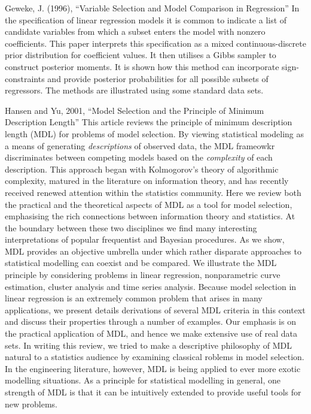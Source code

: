 \documentclass{amsart}[12pt]
\begin{document}
Geweke, J. (1996), ``Variable Selection and Model Comparison in Regression''
In the specification of linear regression models it is common to indicate a list of candidate variables from
which a subset enters the model with nonzero coefficients. This paper interprets this specification as a mixed
continuous-discrete prior distribution for coefficient values. It then utilises a Gibbs sampler to construct
posterior moments. It is shown how this method can incorporate sign-constraints and provide posterior 
probabilities for all possible subsets of regressors. The methods are illustrated using some standard data sets.

Hansen and Yu, 2001, ``Model Selection and the Principle of Minimum Description Length''
This article reviews the principle of minimum description length (MDL) for problems of model selection. By
viewing statistical modeling as a means of generating \emph{descriptions} of observed data, the MDL frameowkr
discriminates between competing models based on the \emph{complexity} of each description. This approach began
with Kolmogorov's theory of algorithmic complexity, matured in the literature on information theory, and has
recently received renewed attention within the statistics community. Here we review both the practical and the
theoretical aspects of MDL as a tool for model selection, emphasising the rich connections between information
theory and statistics. At the boundary between these two disciplines we find many interesting interpretations
of popular frequentist and Bayesian procedures. As we show, MDL provides an objective umbrella under which rather disparate approaches to statistical modelling can coexist and be compared. We illustrate the MDL principle by
considering problems in linear regression, nonparametric curve estimation, cluster analysis and time series
analysis. Because model selection in linear regression is an extremely common problem that arises in many
applications, we present details derivations of several MDL criteria in this context and discuss their properties
through a number of examples. Our emphasis is on the practical application of MDL, and hence we make extensive
use of real data sets. In writing this review, we tried to make a descriptive philosophy of MDL natural to a
statistics audience by examining classical roblems in model selection. In the engineering literature, however,
MDL is being applied to ever more exotic modelling situations. As a principle for statistical modelling in 
general, one strength of MDL is that it can be intuitively extended to provide useful tools for new problems.
\end{document}
